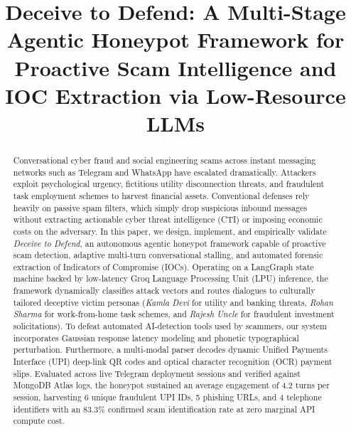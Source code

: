 \documentclass[conference]{IEEEtran}
\begin{document}
\title{Deceive to Defend: A Multi-Stage Agentic Honeypot Framework for Proactive Scam Intelligence and IOC Extraction via Low-Resource LLMs}

\author{
}

\maketitle

\begin{abstract}
Conversational cyber fraud and social engineering scams across instant messaging networks such as Telegram and WhatsApp have escalated dramatically. Attackers exploit psychological urgency, fictitious utility disconnection threats, and fraudulent task employment schemes to harvest financial assets. Conventional defenses rely heavily on passive spam filters, which simply drop suspicious inbound messages without extracting actionable cyber threat intelligence (CTI) or imposing economic costs on the adversary. In this paper, we design, implement, and empirically validate \textit{Deceive to Defend}, an autonomous agentic honeypot framework capable of proactive scam detection, adaptive multi-turn conversational stalling, and automated forensic extraction of Indicators of Compromise (IOCs). Operating on a LangGraph state machine backed by low-latency Groq Language Processing Unit (LPU) inference, the framework dynamically classifies attack vectors and routes dialogues to culturally tailored deceptive victim personas (\textit{Kamla Devi} for utility and banking threats, \textit{Rohan Sharma} for work-from-home task schemes, and \textit{Rajesh Uncle} for fraudulent investment solicitations). To defeat automated AI-detection tools used by scammers, our system incorporates Gaussian response latency modeling and phonetic typographical perturbation. Furthermore, a multi-modal parser decodes dynamic Unified Payments Interface (UPI) deep-link QR codes and optical character recognition (OCR) payment slips. Evaluated across live Telegram deployment sessions and verified against MongoDB Atlas logs, the honeypot sustained an average engagement of 4.2 turns per session, harvesting 6 unique fraudulent UPI IDs, 5 phishing URLs, and 4 telephone identifiers with an 83.3\% confirmed scam identification rate at zero marginal API compute cost.
\end{abstract}
\end{document}
